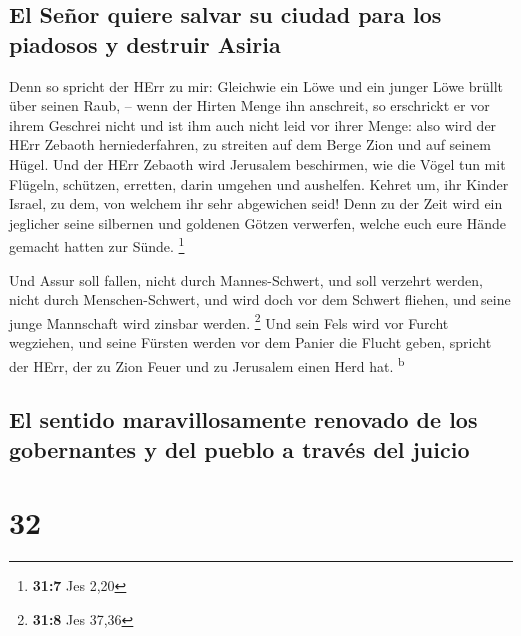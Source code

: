 \hypertarget{el-seuxf1or-quiere-salvar-su-ciudad-para-los-piadosos-y-destruir-asiria}{%
\subsection{El Señor quiere salvar su ciudad para los piadosos y
destruir
Asiria}\label{el-seuxf1or-quiere-salvar-su-ciudad-para-los-piadosos-y-destruir-asiria}}

 Denn so spricht der HErr zu mir: Gleichwie ein Löwe und
ein junger Löwe brüllt über seinen Raub, -- wenn der Hirten Menge ihn
anschreit, so erschrickt er vor ihrem Geschrei nicht und ist ihm auch
nicht leid vor ihrer Menge: also wird der HErr Zebaoth herniederfahren,
zu streiten auf dem Berge Zion und auf seinem Hügel.  Und
der HErr Zebaoth wird Jerusalem beschirmen, wie die Vögel tun mit
Flügeln, schützen, erretten, darin umgehen und aushelfen. 
Kehret um, ihr Kinder Israel, zu dem, von welchem ihr sehr abgewichen
seid!  Denn zu der Zeit wird ein jeglicher seine silbernen
und goldenen Götzen verwerfen, welche euch eure Hände gemacht hatten zur
Sünde. \footnote{\textbf{31:7} Jes 2,20}

 Und Assur soll fallen, nicht durch Mannes-Schwert, und
soll verzehrt werden, nicht durch Menschen-Schwert, und wird doch vor
dem Schwert fliehen, und seine junge Mannschaft wird zinsbar werden.
\footnote{\textbf{31:8} Jes 37,36}  Und sein Fels wird vor
Furcht wegziehen, und seine Fürsten werden vor dem Panier die Flucht
geben, spricht der HErr, der zu Zion Feuer und zu Jerusalem einen Herd
hat. \textsuperscript{b}

\hypertarget{el-sentido-maravillosamente-renovado-de-los-gobernantes-y-del-pueblo-a-travuxe9s-del-juicio}{%
\subsection{El sentido maravillosamente renovado de los gobernantes y
del pueblo a través del
juicio}\label{el-sentido-maravillosamente-renovado-de-los-gobernantes-y-del-pueblo-a-travuxe9s-del-juicio}}

\hypertarget{section-31}{%
\section{32}\label{section-31}}

